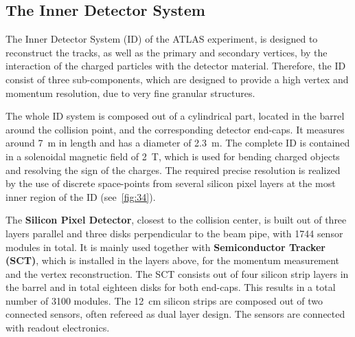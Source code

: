 \subsection{The Inner Detector System}\label{ID}
The Inner Detector System (ID) of the ATLAS experiment, is designed to reconstruct the tracks, as well as the primary and secondary vertices, by the interaction of the charged particles with the detector material. Therefore, the ID consist of three sub-components, which are designed to provide a high vertex and momentum resolution, due to  very fine granular structures.

The whole ID system is composed out of a cylindrical part, located in the barrel around the collision point, and the corresponding detector end-caps. It measures around 7~m in length and has a diameter of 2.3~m. The complete ID is contained in a solenoidal magnetic field of 2~T, which is used for bending charged objects and resolving the sign of the charges. The required precise resolution is realized by the use of discrete space-points from several silicon pixel layers at the most inner region of the ID (see~\cref{fig:34}).

 The \textbf{Silicon Pixel Detector}, closest to the collision center, is built out of three layers parallel and three disks perpendicular to the beam pipe, with 1744 sensor modules in total. It is mainly used together with \textbf{Semiconductor Tracker (SCT)}, which is installed in the layers above, for the momentum measurement and the vertex reconstruction. The SCT consists out of four silicon strip layers in the barrel and in total eighteen disks for both end-caps. This results in a total number of 3100 modules. The 12~cm silicon strips are composed out of two connected sensors, often refereed as dual layer design. The sensors are connected with readout electronics.

